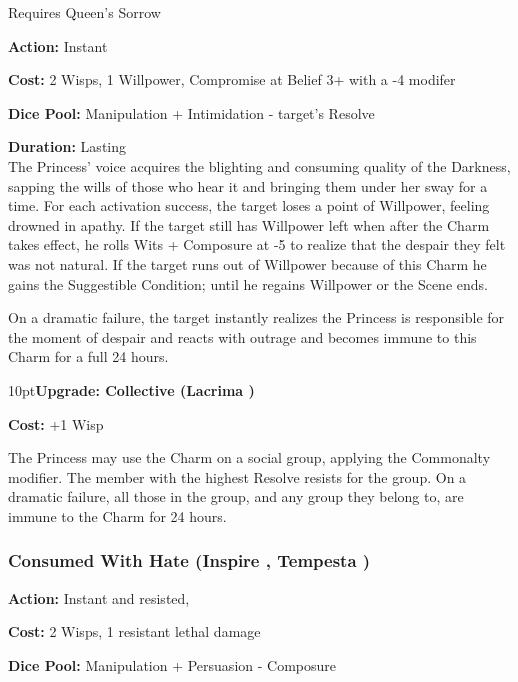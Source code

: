 \noindent Requires Queen's Sorrow

\noindent \textbf{Action:} Instant

\noindent \textbf{Cost:} 2 Wisps, 1 Willpower, Compromise at Belief 3+ with a -4 modifer

\noindent \textbf{Dice Pool:}  Manipulation + Intimidation - target's Resolve

\noindent \textbf{Duration:} Lasting \\

\noindent The Princess' voice acquires the blighting and consuming quality of the Darkness, sapping the wills of those who hear it and bringing them under her sway for a time. For each activation success, the target loses a point of Willpower, feeling drowned in apathy. If the target still has Willpower left when after the Charm takes effect, he rolls Wits + Composure at -5 to realize that the despair they felt was not natural. If the target runs out of Willpower because of this Charm he gains the Suggestible Condition; until he regains Willpower or the Scene ends.

On a dramatic failure, the target instantly realizes the Princess is responsible for the moment of despair and reacts with outrage and becomes immune to this Charm for a full 24 hours.

\begin{myindentpar}{10pt}\textbf{Upgrade: Collective (Lacrima \textbullet\textbullet\textbullet\textbullet)}

\noindent \textbf{Cost:} +1 Wisp

The Princess may use the Charm on a social group, applying the Commonalty modifier. The member with the highest Resolve resists for the group. On a dramatic failure, all those in the group, and any group they belong to, are immune to the Charm for 24 hours.\end{myindentpar}

\subsubsection*{Consumed With Hate (Inspire \textbullet\textbullet\textbullet\textbullet, Tempesta \textbullet\textbullet\textbullet)}

\noindent \textbf{Action:} Instant and resisted, 

\noindent \textbf{Cost:} 2 Wisps, 1 resistant lethal damage

\noindent \textbf{Dice Pool:} Manipulation + Persuasion - Composure

